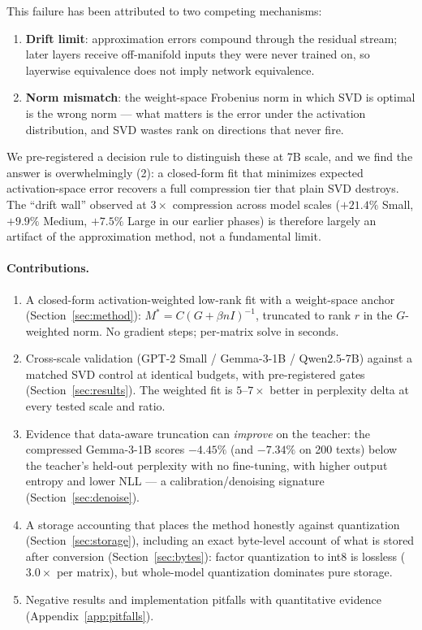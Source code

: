 \documentclass[11pt]{article}
\begin{document}
This failure has been attributed to two competing mechanisms:
\begin{enumerate}[label=(\arabic*)]
  \item \textbf{Drift limit}: approximation errors compound through the
    residual stream; later layers receive off-manifold inputs they were
    never trained on, so layerwise equivalence does not imply network
    equivalence.
  \item \textbf{Norm mismatch}: the weight-space Frobenius norm in which SVD
    is optimal is the wrong norm --- what matters is the error under the
    activation distribution, and SVD wastes rank on directions that never
    fire.
\end{enumerate}
We pre-registered a decision rule to distinguish these at 7B scale, and we
find the answer is overwhelmingly (2): a closed-form fit that minimizes
expected activation-space error recovers a full compression tier that plain
SVD destroys. The ``drift wall'' observed at $3\times$ compression across
model scales ($+21.4\%$ Small, $+9.9\%$ Medium, $+7.5\%$ Large in our
earlier phases) is therefore largely an artifact of the approximation
method, not a fundamental limit.

\paragraph{Contributions.}
\begin{enumerate}[leftmargin=1.5em]
  \item A closed-form activation-weighted low-rank fit with a weight-space
    anchor (Section~\ref{sec:method}): $M^{*} = C(G+\beta n I)^{-1}$,
    truncated to rank $r$ in the $G$-weighted norm. No gradient steps;
    per-matrix solve in seconds.
  \item Cross-scale validation (GPT-2 Small / Gemma-3-1B / Qwen2.5-7B)
    against a matched SVD control at identical budgets, with pre-registered
    gates (Section~\ref{sec:results}). The weighted fit is $5$--$7\times$
    better in perplexity delta at every tested scale and ratio.
  \item Evidence that data-aware truncation can \emph{improve} on the
    teacher: the compressed Gemma-3-1B scores $-4.45\%$ (and $-7.34\%$ on
    200 texts) below the teacher's held-out perplexity with no
    fine-tuning, with higher output entropy and lower NLL --- a
    calibration/denoising signature (Section~\ref{sec:denoise}).
  \item A storage accounting that places the method honestly against
    quantization (Section~\ref{sec:storage}), including an exact
    byte-level account of what is stored after conversion
    (Section~\ref{sec:bytes}): factor quantization to int8 is lossless
    ($3.0\times$ per matrix), but whole-model quantization dominates pure
    storage.
  \item Negative results and implementation pitfalls with quantitative
    evidence (Appendix~\ref{app:pitfalls}).
\end{enumerate}
\end{document}
